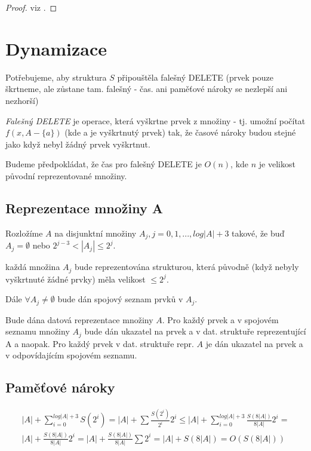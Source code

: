 \begin{proof}
viz \cite{mehlhorn-overmars}.
\end{proof}


\section{Dynamizace}

Potřebujeme, aby struktura $S$ připouštěla falešný DELETE (prvek pouze
škrtneme, ale zůstane tam. falešný - čas. ani paměťové nároky se nezlepší
ani nezhorší)

\begin{defn}
\emph{Falešný DELETE} je operace, která vyškrtne prvek z množiny - tj. umožní
počítat $f(x,A-\{a\})$ (kde a je vyškrtnutý prvek) tak, že časové nároky
budou stejné jako když nebyl žádný prvek vyškrtnut.
\end{defn}

Budeme předpokládat, že čas pro falešný DELETE je $O(n)$, kde $n$ je velikost
původní reprezentované množiny.

\subsection{Reprezentace množiny A}

Rozložíme $A$ na disjunktní množiny $A_j, j=0,1,...,log|A|+3$
takové, že buď $A_j = \emptyset$ nebo $2^{j-3} < |A_j| \leq 2^j$.
\par
každá množina $A_j$ bude reprezentována strukturou, která původně (když
nebyly vyškrtnuté žádné prvky) měla velikost $\leq 2^j$.
\par
Dále $\forall A_j \neq \emptyset$ bude dán spojový seznam prvků v $A_j$.
\par
Bude dána datová reprezentace množiny $A$. Pro každý prvek a v spojovém
seznamu množiny $A_j$ bude dán ukazatel na prvek a  v dat. struktuře
reprezentující A a naopak. Pro každý prvek v dat. struktuře repr. $A$ je dán
ukazatel na prvek a v odpovídajícím spojovém seznamu.

\subsection{Paměťové nároky}

\begin{multline}
|A| + \sum_{i=0}^{log|A|+3} S(2^i) = |A| + \sum \frac{S(2^i)}{2^i} 2^i
\leq |A| + \sum_{i=0}^{log|A|+3} \frac{S(8|A|)}{8|A|} 2^i = \\
|A| + \frac{S(8|A|)}{8|A|} 2^i = |A| + \frac{S(8|A|)}{8|A|} \sum 2^i = 
|A| + S(8|A|) = O(S(8|A|))
\end{multline}
\par

